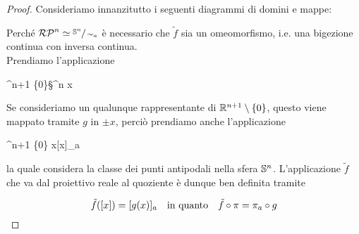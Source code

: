 \begin{proof}
	Consideriamo innanzitutto i seguenti diagrammi di domini e mappe:
	

	Perché $ \rp{n} \simeq \sfrac{\S^{n}}{\sim_{a}} $ è necessario che $ \tilde{f} $ sia un omeomorfismo, i.e. una bigezione continua con inversa continua.\\
	Prendiamo l'applicazione
	
		{\R^{n+1} \setminus \{0\}}{\S^{n}}
		{x}{}

	Se consideriamo un qualunque rappresentante di $ \R^{n+1} \setminus \{0\} $, questo viene mappato tramite $ g $ in $ \pm x $, perciò prendiamo anche l'applicazione
	
		{\R^{n+1} \setminus \{0\}}{}
		{x}{[x]_{a}}

	la quale considera la classe dei punti antipodali nella sfera $ \S^{n} $. L'applicazione $ \tilde{f} $ che va dal proiettivo reale al quoziente è dunque ben definita tramite
	
	\begin{equation}
		\tilde{f}([x]) = [g(x)]_{a} \qq{in quanto} \tilde{f} \circ \pi = \pi_{a} \circ g
	\end{equation}


\end{proof}
